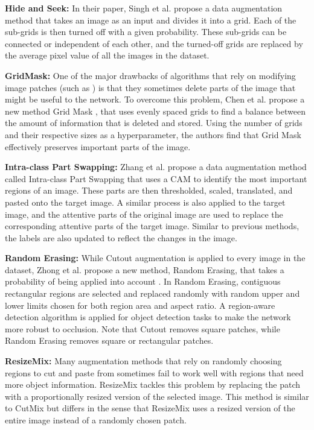 \documentclass[a4paper,11pt,openright]{book}
\begin{document}
\textbf{Hide and Seek: }
In their paper, Singh et al. \cite{singhHideandSeekDataAugmentation2018} propose a data augmentation method that takes an image as an input and divides it into a grid. Each of the sub-grids is then turned off with a given probability. These sub-grids can be connected or independent of each other, and the turned-off grids are replaced by the average pixel value of all the images in the dataset.

\textbf{GridMask: }
One of the major drawbacks of algorithms that rely on modifying image patches (such as \cite{singhHideandSeekDataAugmentation2018,devriesImprovedRegularizationConvolutional2017,zhongRandomErasingData2020}) is that they sometimes delete parts of the image that might be useful to the network. To overcome this problem, Chen et al. propose a new method Grid Mask \cite{chenGridMaskDataAugmentation2020}, that uses evenly spaced grids to find a balance between the amount of information that is deleted and stored. Using the number of grids and their respective sizes as a hyperparameter, the authors find that Grid Mask effectively preserves important parts of the image.

\textbf{Intra-class Part Swapping: }
Zhang et al. propose a data augmentation method called Intra-class Part Swapping \cite{zhangIntraClassPartSwapping2021} that uses a CAM \cite{zhouLearningDeepFeatures2016} to identify the most important regions of an image. These parts are then thresholded, scaled, translated, and pasted onto the target image. A similar process is also applied to the target image, and the attentive parts of the original image are used to replace the corresponding attentive parts of the target image. Similar to previous methods, the labels are also updated to reflect the changes in the image.

\textbf{Random Erasing: }
While Cutout augmentation \cite{devriesImprovedRegularizationConvolutional2017} is applied to every image in the dataset, Zhong et al. propose a new method, Random Erasing, that takes a probability of being applied into account \cite{zhongRandomErasingData2020}. In Random Erasing, contiguous rectangular regions are selected and replaced randomly with random upper and lower limits chosen for both region area and aspect ratio. A region-aware detection algorithm is applied for object detection tasks to make the network more robust to occlusion. Note that Cutout removes square patches, while Random Erasing removes square or rectangular patches.

\textbf{ResizeMix: }
Many augmentation methods that rely on randomly choosing regions to cut and paste from sometimes fail to work well with regions that need more object information. ResizeMix \cite{qinResizeMixMixingData2020} tackles this problem by replacing the patch with a proportionally resized version of the selected image. This method is similar to CutMix \cite{yunCutMixRegularizationStrategy2019} but differs in the sense that ResizeMix uses a resized version of the entire image instead of a randomly chosen patch.
\end{document}
